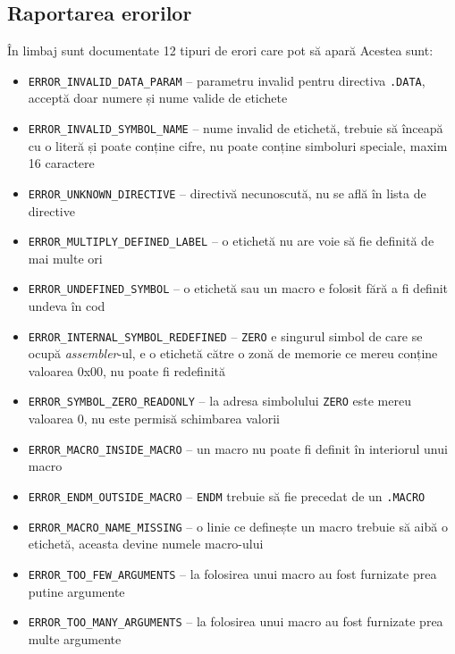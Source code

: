 \documentclass[../main.tex]{subfiles}
\begin{document}
\subsection{Raportarea erorilor}
În limbaj sunt documentate 12 tipuri de erori care pot să apară Acestea sunt:
\begin{itemize}
    \item \verb|ERROR_INVALID_DATA_PARAM| -- parametru invalid pentru directiva \verb|.DATA|, acceptă doar numere și nume valide de etichete
    \item \verb|ERROR_INVALID_SYMBOL_NAME| -- nume invalid de etichetă, trebuie să înceapă cu o literă și poate conține cifre, nu poate conține simboluri speciale, maxim 16 caractere
    \item \verb|ERROR_UNKNOWN_DIRECTIVE| -- directivă necunoscută, nu se află în lista de directive
    \item \verb|ERROR_MULTIPLY_DEFINED_LABEL| -- o etichetă nu are voie să fie definită de mai multe ori
    \item \verb|ERROR_UNDEFINED_SYMBOL| -- o etichetă sau un macro e folosit fără a fi definit undeva în cod
    \item \verb|ERROR_INTERNAL_SYMBOL_REDEFINED| -- \verb|ZERO| e singurul simbol de care se ocupă \emph{assembler}-ul, e o etichetă către o zonă de memorie ce mereu conține valoarea 0x00, nu poate fi redefinită
    \item \verb|ERROR_SYMBOL_ZERO_READONLY| -- la adresa simbolului \verb|ZERO| este mereu valoarea 0, nu este permisă schimbarea valorii
    \item \verb|ERROR_MACRO_INSIDE_MACRO| -- un macro nu poate fi definit în interiorul unui macro
    \item \verb|ERROR_ENDM_OUTSIDE_MACRO| -- \verb|ENDM| trebuie să fie precedat de un \verb|.MACRO|
    \item \verb|ERROR_MACRO_NAME_MISSING| -- o linie ce definește un macro trebuie să aibă o etichetă, aceasta devine numele macro-ului
    \item \verb|ERROR_TOO_FEW_ARGUMENTS| -- la folosirea unui macro au fost furnizate prea putine argumente
    \item \verb|ERROR_TOO_MANY_ARGUMENTS| -- la folosirea unui macro au fost furnizate prea multe argumente
\end{itemize}
    
\end{document}
